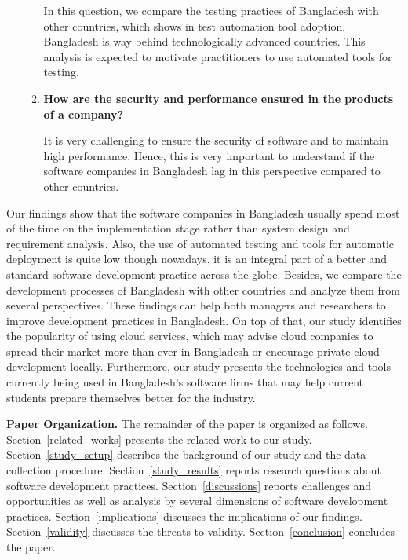 \begin{itemize}[leftmargin=10pt]
\begin{enumerate}[label={\textbf{RQ\arabic{*}.}}, leftmargin=30pt, start=5]
     In this question, we compare the testing practices of Bangladesh with other countries, which shows in test automation tool adoption. Bangladesh is way behind technologically advanced countries. This analysis is expected to motivate practitioners to use automated tools for testing.
    
    \item \textbf{How are the security and performance ensured in the products of a company?}
    
     It is very challenging to ensure the security of software and to maintain high performance. Hence, this is very important to understand if the software companies in Bangladesh lag in this perspective compared to other countries.
    
    \end{enumerate}
    
\end{itemize}

Our findings show that the software companies in Bangladesh usually spend most of the time on the implementation stage rather than system design and requirement analysis. Also, the use of automated testing and tools for automatic deployment is quite low though nowadays, it is an integral part of a better and standard software development practice across the globe. Besides, we compare the development processes of Bangladesh with other countries and analyze them from several perspectives. These findings can help both managers and researchers to improve development practices in Bangladesh. On top of that, our study identifies the popularity of using cloud services, which may advise cloud companies to spread their market more than ever in Bangladesh or encourage private cloud development locally. Furthermore, our study presents the technologies and tools currently being used in Bangladesh's software firms that may help current students prepare themselves better for the industry.

\noindent\textbf{Paper Organization.} The remainder of the paper is organized as follows. Section~\ref{related_works} presents the related work to our study. Section~\ref{study_setup} describes the background of our study and the data collection procedure. Section~\ref{study_results} reports research questions about software development practices. Section~\ref{discussions} reports challenges and opportunities as well as analysis by several dimensions of software development practices. Section~\ref{implications} discusses the implications of our findings. Section~\ref{validity} discusses the threats to validity. Section~\ref{conclusion} concludes the paper.
